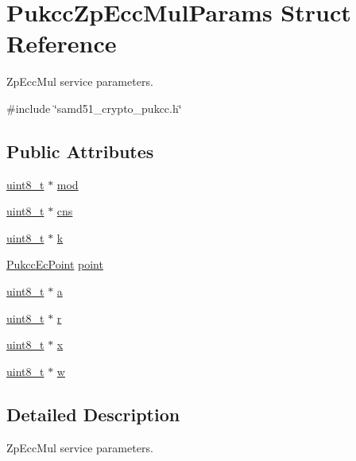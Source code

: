 \hypertarget{structPukccZpEccMulParams}{}\section{Pukcc\+Zp\+Ecc\+Mul\+Params Struct Reference}
\label{structPukccZpEccMulParams}


Zp\+Ecc\+Mul service parameters.  




{\ttfamily \#include \char`\"{}samd51\+\_\+crypto\+\_\+pukcc.\+h\char`\"{}}

\subsection*{Public Attributes}
\begin{DoxyCompactItemize}
\item 
\hyperlink{stdint_8h_aba7bc1797add20fe3efdf37ced1182c5}{uint8\+\_\+t} $\ast$ \hyperlink{structPukccZpEccMulParams_aa5827ad1fea4f3005beffe8b2edeca6e}{mod}
\item 
\hyperlink{stdint_8h_aba7bc1797add20fe3efdf37ced1182c5}{uint8\+\_\+t} $\ast$ \hyperlink{structPukccZpEccMulParams_a4db4d800164548e8860757561f4b8e4c}{cns}
\item 
\hyperlink{stdint_8h_aba7bc1797add20fe3efdf37ced1182c5}{uint8\+\_\+t} $\ast$ \hyperlink{structPukccZpEccMulParams_a9ac059035c463cbe4f2f94521e1c4e30}{k}
\item 
\hyperlink{structPukccEcPoint}{Pukcc\+Ec\+Point} \hyperlink{structPukccZpEccMulParams_ac18676b15ed41f4d801b8d419478a9e3}{point}
\item 
\hyperlink{stdint_8h_aba7bc1797add20fe3efdf37ced1182c5}{uint8\+\_\+t} $\ast$ \hyperlink{structPukccZpEccMulParams_aa0a8b0bc9f5ecd329f7abbb4727d2bf8}{a}
\item 
\hyperlink{stdint_8h_aba7bc1797add20fe3efdf37ced1182c5}{uint8\+\_\+t} $\ast$ \hyperlink{structPukccZpEccMulParams_a44842039661952ef4db6a9b295583422}{r}
\item 
\hyperlink{stdint_8h_aba7bc1797add20fe3efdf37ced1182c5}{uint8\+\_\+t} $\ast$ \hyperlink{structPukccZpEccMulParams_ae3b79d9b1db130b111a66cf70c44025d}{x}
\item 
\hyperlink{stdint_8h_aba7bc1797add20fe3efdf37ced1182c5}{uint8\+\_\+t} $\ast$ \hyperlink{structPukccZpEccMulParams_a8ce33078130810d053a89097a40fb16e}{w}
\end{DoxyCompactItemize}


\subsection{Detailed Description}
Zp\+Ecc\+Mul service parameters. 

